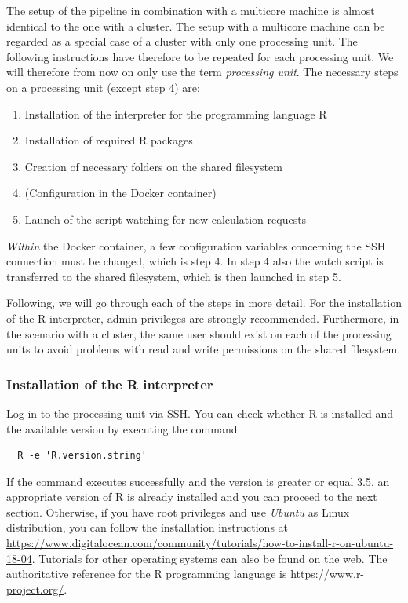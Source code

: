 \documentclass[12pt,a4paper]{scrartcl}
\begin{document}
 The setup of the pipeline in combination with a multicore machine is almost identical to the one with a cluster.
 The setup with a multicore machine can be regarded as a special case of a cluster with only one processing unit.
 The following instructions have therefore to be repeated for each processing unit.
 We will therefore from now on only use the term \textit{processing unit}.
 The necessary steps on a processing unit (except step 4) are:
 \begin{enumerate}
  \item Installation of the interpreter for the programming language R
  \item Installation of required R packages
  \item Creation of necessary folders on the shared filesystem
  \item (Configuration in the Docker container)
  \item Launch of the script watching for new calculation requests 
 \end{enumerate}
 \textit{Within} the Docker container, a few configuration variables concerning the SSH connection must be changed, which is step 4.
 In step 4 also the watch script is transferred to the shared filesystem, which is then launched in step 5.

 Following, we will go through each of the steps in more detail.
 For the installation of the R interpreter, admin privileges are strongly recommended.
 Furthermore, in the scenario with a cluster, the same user should exist on each of the processing units to avoid problems with read and write permissions on the shared filesystem.
 
\subsubsection{Installation of the R interpreter}

Log in to the processing unit via SSH.
You can check whether R is installed and the available version by executing the command
\begin{verbatim}
  R -e 'R.version.string'
\end{verbatim}
If the command executes successfully and the version is greater or equal 3.5, an appropriate version of R is already installed and you can proceed to the next section.
Otherwise, if you have root privileges and use \textit{Ubuntu} as Linux distribution, you can follow the installation instructions at \url{https://www.digitalocean.com/community/tutorials/how-to-install-r-on-ubuntu-18-04}.
Tutorials for other operating systems can also be found on the web.
The authoritative reference for the R programming language is \url{https://www.r-project.org/}.
\end{document}
